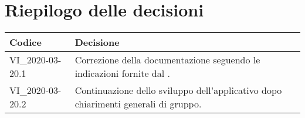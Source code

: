 \section{Riepilogo delle decisioni}
\setcounter{table}{-1}
{

\centering
\renewcommand{\arraystretch}{1.5}
\begin{longtable}{>{\centering}p{} >{}p{}}
\rowcolor{azzurro1}
\textbf{Codice} &
\centerline{\textbf{Decisione}}\\
\endhead

VI{\_}2020-03-20.1 & Correzione della documentazione seguendo le indicazioni fornite dal \VT{}.\\
VI{\_}2020-03-20.2 & Continuazione dello sviluppo dell'applicativo dopo chiarimenti generali di gruppo.\\
\end{longtable}
}